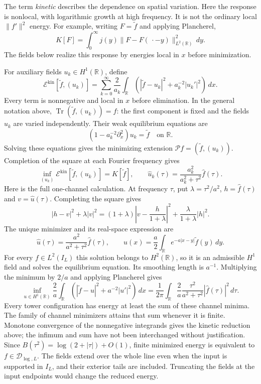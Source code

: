 The term \emph{kinetic} describes the dependence on spatial variation.
Here the response is nonlocal, with logarithmic growth at high
frequency. It is not the ordinary local $\lVert f'\rVert^2$ energy.
For example, writing $F=\widetilde f$ and applying Plancherel,
\[
K[F]=\int_0^\infty j(y)
\lVert F-F(\,\cdot-y)\rVert_{L^2(\mathbb R)}^2\,dy.
\]
The fields below realize this response by energies local in $x$
before minimization.

For auxiliary fields $u_k\in H^1(\mathbb R)$, define
\begin{equation}
\mathcal E^{\mathrm{kin}}[\widetilde f,(u_k)]
=\sum_{k=0}^{\infty}\frac2{a_k}
\int_{\mathbb R}
\left(|\widetilde f-u_k|^2+a_k^{-2}|u_k'|^2\right)\,dx .
\label{eq:rh-kinetic-bulk}
\end{equation}
Every term is nonnegative and local in $x$ before elimination.
In the general notation above,
$\operatorname{Tr}(\widetilde f,(u_k))=f$: the first component is
fixed and the fields $u_k$ are varied independently.
Their weak equilibrium equations are
\[
(1-a_k^{-2}\partial_x^2)u_k=\widetilde f
\quad\text{on }\mathbb R.
\]
Solving these equations gives the minimizing extension
$\mathcal P f=(\widetilde f,(u_k))$.
Completion of the square at each Fourier frequency gives
\begin{equation}
\inf_{(u_k)}\mathcal E^{\mathrm{kin}}[\widetilde f,(u_k)]
=K[\widetilde f],\qquad
\widehat u_k(\tau)=\frac{a_k^2}{a_k^2+\tau^2}\widehat f(\tau).
\label{eq:rh-kinetic-reduction}
\end{equation}
Here is the full one-channel calculation. At frequency $\tau$, put
$\lambda=\tau^2/a^2$, $h=\widehat f(\tau)$ and $v=\widehat u(\tau)$.
Completing the square gives
\[
|h-v|^2+\lambda|v|^2
=(1+\lambda)\left|v-\frac{h}{1+\lambda}\right|^2
+\frac{\lambda}{1+\lambda}|h|^2.
\]
The unique minimizer and its real-space expression are
\[
\widehat u(\tau)=\frac{a^2}{a^2+\tau^2}\widehat f(\tau),
\qquad
u(x)=\frac a2\int_{\mathbb R}e^{-a|x-y|}\widetilde f(y)\,dy.
\]
For every $f\in L^2(I_L)$ this solution belongs to $H^2(\mathbb R)$,
so it is an admissible $H^1$ field and solves the equilibrium equation.
Its smoothing length is $a^{-1}$. Multiplying the minimum by $2/a$
and applying Plancherel gives
\[
\inf_{u\in H^1(\mathbb R)}
\frac2a\int_{\mathbb R}
\left(|\widetilde f-u|^2+a^{-2}|u'|^2\right)\,dx
=\frac1{2\pi}\int_{\mathbb R}
\frac2a\frac{\tau^2}{a^2+\tau^2}|\widehat f(\tau)|^2\,d\tau.
\]
Every tower configuration has energy at least the sum of these channel
minima. The family of channel minimizers attains that sum whenever it
is finite. Monotone convergence of the nonnegative integrands gives
the kinetic reduction above; the infimum and sum have not been
interchanged without justification. Since
$B(\tau^2)=\log(2+|\tau|)+O(1)$, finite minimized energy is equivalent
to $f\in\mathcal D_{\log,L}$. The fields extend over the whole line
even when the input is supported in $I_L$, and their exterior tails
are included. Truncating the fields at the input endpoints would
change the reduced energy.

